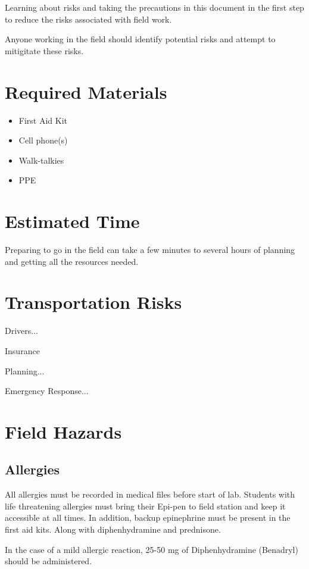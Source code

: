 \documentclass[12pt]{../SOP3_beta}\usepackage[]{graphicx}\usepackage[]{color}
\begin{document}
\NP Learning about risks and taking the precautions in this document in the first step to reduce the risks associated with field work. 

\NP Anyone working in the field should identify potential risks and attempt to mitigitate these risks. 

\section{Required Materials}

\begin{itemize}
  \item First Aid Kit
  \item Cell phone(s)
  \item Walk-talkies
  \item PPE
\end{itemize}

\section{Estimated Time}

\NP Preparing to go in the field can take a few minutes to several hours of planning and getting all the resources needed.

\section{Transportation Risks}

\NP Drivers...

\NP Insurance

\NP Planning...

\NP Emergency Response...


\section{Field Hazards}

\subsection{Allergies}

\NP All allergies must be recorded in medical files before start of lab. Students with life threatening allergies must bring their Epi-pen to field station and keep it accessible at all times. In addition, backup epinephrine must be present in the first aid kits. Along with diphenhydramine and prednisone. 

\NP In the case of a mild allergic reaction, 25-50 mg of Diphenhydramine (Benadryl) should be administered. 
\end{document}
